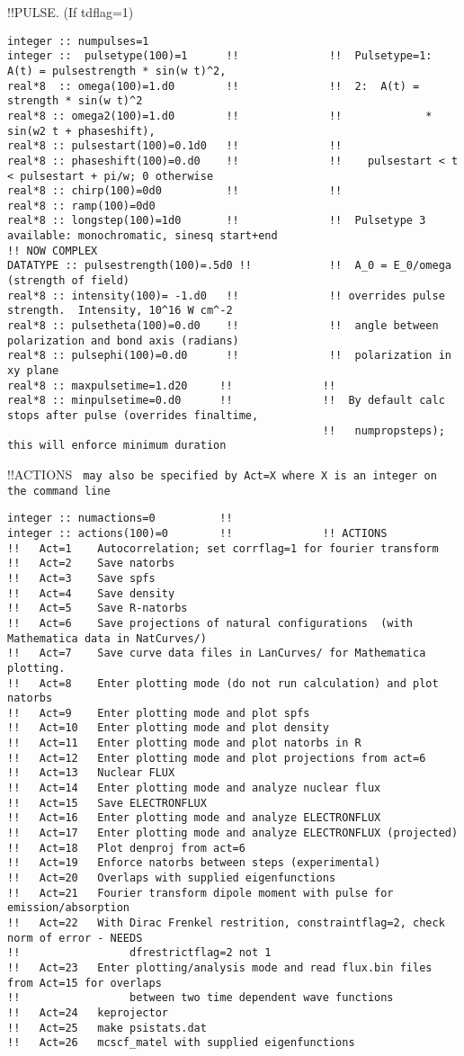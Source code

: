 !!{\large \quad PULSE.  (If tdflag=1) }
\begin{verbatim}
integer :: numpulses=1
integer ::  pulsetype(100)=1      !!              !!  Pulsetype=1:  A(t) = pulsestrength * sin(w t)^2,
real*8  :: omega(100)=1.d0        !!              !!  2:  A(t) = strength * sin(w t)^2 
real*8 :: omega2(100)=1.d0        !!              !!             * sin(w2 t + phaseshift),
real*8 :: pulsestart(100)=0.1d0   !!              !!   
real*8 :: phaseshift(100)=0.d0    !!              !!    pulsestart < t < pulsestart + pi/w; 0 otherwise
real*8 :: chirp(100)=0d0          !!              !!
real*8 :: ramp(100)=0d0
real*8 :: longstep(100)=1d0       !!              !!  Pulsetype 3 available: monochromatic, sinesq start+end
!! NOW COMPLEX
DATATYPE :: pulsestrength(100)=.5d0 !!            !!  A_0 = E_0/omega (strength of field)  
real*8 :: intensity(100)= -1.d0   !!              !! overrides pulse strength.  Intensity, 10^16 W cm^-2 
real*8 :: pulsetheta(100)=0.d0    !!              !!  angle between polarization and bond axis (radians)
real*8 :: pulsephi(100)=0.d0      !!              !!  polarization in xy plane
real*8 :: maxpulsetime=1.d20     !!              !!  
real*8 :: minpulsetime=0.d0      !!              !!  By default calc stops after pulse (overrides finaltime,
                                                 !!   numpropsteps); this will enforce minimum duration
\end{verbatim} 
!!{\large \quad ACTIONS} \verb# may also be specified by Act=X where X is an integer on the command line #
\begin{verbatim}
integer :: numactions=0          !! 
integer :: actions(100)=0        !!              !! ACTIONS
!!   Act=1    Autocorrelation; set corrflag=1 for fourier transform
!!   Act=2    Save natorbs
!!   Act=3    Save spfs
!!   Act=4    Save density
!!   Act=5    Save R-natorbs
!!   Act=6    Save projections of natural configurations  (with Mathematica data in NatCurves/)
!!   Act=7    Save curve data files in LanCurves/ for Mathematica plotting.
!!   Act=8    Enter plotting mode (do not run calculation) and plot natorbs 
!!   Act=9    Enter plotting mode and plot spfs
!!   Act=10   Enter plotting mode and plot density
!!   Act=11   Enter plotting mode and plot natorbs in R
!!   Act=12   Enter plotting mode and plot projections from act=6
!!   Act=13   Nuclear FLUX 
!!   Act=14   Enter plotting mode and analyze nuclear flux
!!   Act=15   Save ELECTRONFLUX
!!   Act=16   Enter plotting mode and analyze ELECTRONFLUX 
!!   Act=17   Enter plotting mode and analyze ELECTRONFLUX (projected)
!!   Act=18   Plot denproj from act=6
!!   Act=19   Enforce natorbs between steps (experimental)
!!   Act=20   Overlaps with supplied eigenfunctions
!!   Act=21   Fourier transform dipole moment with pulse for emission/absorption
!!   Act=22   With Dirac Frenkel restrition, constraintflag=2, check norm of error - NEEDS
!!                 dfrestrictflag=2 not 1
!!   Act=23   Enter plotting/analysis mode and read flux.bin files from Act=15 for overlaps
!!                 between two time dependent wave functions
!!   Act=24   keprojector
!!   Act=25   make psistats.dat
!!   Act=26   mcscf_matel with supplied eigenfunctions 
\end{verbatim}

